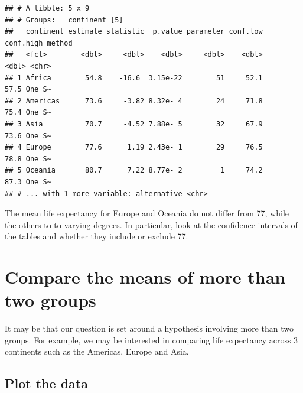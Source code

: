 \documentclass[12pt,]{krantz}
\makeatletter
\newenvironment{Shaded}{\begin{snugshade}}{\end{snugshade}}
\newcommand{\DataTypeTok}[1]{\textcolor[rgb]{0.13,0.29,0.53}{#1}}
\newcommand{\DecValTok}[1]{\textcolor[rgb]{0.00,0.00,0.81}{#1}}
\newcommand{\KeywordTok}[1]{\textcolor[rgb]{0.13,0.29,0.53}{\textbf{#1}}}
\newcommand{\NormalTok}[1]{#1}
\newcommand{\OperatorTok}[1]{\textcolor[rgb]{0.81,0.36,0.00}{\textbf{#1}}}
\newcommand{\StringTok}[1]{\textcolor[rgb]{0.31,0.60,0.02}{#1}}
\newenvironment{kframe}{%
\medskip{}
\setlength{\fboxsep}{.8em}
 \def\at@end@of@kframe{}%
 \ifinner\ifhmode%
  \def\at@end@of@kframe{\end{minipage}}%
  \begin{minipage}{\columnwidth}%
 \fi\fi%
 \def\FrameCommand##1{\hskip\@totalleftmargin \hskip-\fboxsep
 \colorbox{shadecolor}{##1}\hskip-\fboxsep
     \hskip-\linewidth \hskip-\@totalleftmargin \hskip\columnwidth}%
 \MakeFramed {\advance\hsize-\width
   \@totalleftmargin\z@ \linewidth\hsize
   \@setminipage}}%
 {\par\unskip\endMakeFramed%
 \at@end@of@kframe}
\renewenvironment{Shaded}{\begin{kframe}}{\end{kframe}}
\theoremstyle{definition}
\theoremstyle{definition}
\theoremstyle{definition}
\theoremstyle{remark}
\makeatother
\begin{document}
\begin{verbatim}
## # A tibble: 5 x 9
## # Groups:   continent [5]
##   continent estimate statistic  p.value parameter conf.low conf.high method
##   <fct>        <dbl>     <dbl>    <dbl>     <dbl>    <dbl>     <dbl> <chr> 
## 1 Africa        54.8    -16.6  3.15e-22        51     52.1      57.5 One S~
## 2 Americas      73.6     -3.82 8.32e- 4        24     71.8      75.4 One S~
## 3 Asia          70.7     -4.52 7.88e- 5        32     67.9      73.6 One S~
## 4 Europe        77.6      1.19 2.43e- 1        29     76.5      78.8 One S~
## 5 Oceania       80.7      7.22 8.77e- 2         1     74.2      87.3 One S~
## # ... with 1 more variable: alternative <chr>
\end{verbatim}

 
  

The mean life expectancy for Europe and Oceania do not differ from 77,
while the others to to varying degrees. In particular, look at the
confidence intervals of the tables and whether they include or exclude
77.

\hypertarget{compare-the-means-of-more-than-two-groups}{%
\section{Compare the means of more than two
groups}\label{compare-the-means-of-more-than-two-groups}}

It may be that our question is set around a hypothesis involving more
than two groups. For example, we may be interested in comparing life
expectancy across 3 continents such as the Americas, Europe and Asia.

\hypertarget{plot-the-data-1}{%
\subsection{Plot the data}\label{plot-the-data-1}}

\begin{Shaded}
\end{Shaded}
\end{document}
